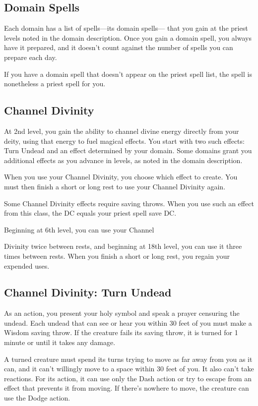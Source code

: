\subsection{Domain Spells}

Each domain has a list of spells—its domain spells— that you gain at the priest levels noted in the domain description. Once you gain a domain spell, you always have it prepared, and it doesn’t count against the number of spells you can prepare each day.

If you have a domain spell that doesn’t appear on the priest spell list, the spell is nonetheless a priest spell for you.

\subsection{Channel Divinity}

At 2nd level, you gain the ability to channel divine energy directly from your deity, using that energy to fuel magical effects. You start with two such effects: Turn Undead and an effect determined by your domain. Some domains grant you additional effects as you advance in levels, as noted in the domain description.

When you use your Channel Divinity, you choose which effect to create. You must then finish a short or long rest to use your Channel Divinity again.

Some Channel Divinity effects require saving throws. When you use such an effect from this class, the DC equals your priest spell save DC.

Beginning at 6th level, you can use your Channel

Divinity twice between rests, and beginning at 18th level, you can use it three times between rests. When you finish a short or long rest, you regain your expended uses.

\subsection{Channel Divinity: Turn Undead}

As an action, you present your holy symbol and speak a prayer censuring the undead. Each undead that can see or hear you within 30 feet of you must make a Wisdom saving throw. If the creature fails its saving throw, it is turned for 1 minute or until it takes any damage.

A turned creature must spend its turns trying to move as far away from you as it can, and it can’t willingly move to a space within 30 feet of you. It also can’t take reactions. For its action, it can use only the Dash action or try to escape from an effect that prevents it from moving. If there’s nowhere to move, the creature can use the Dodge action.

